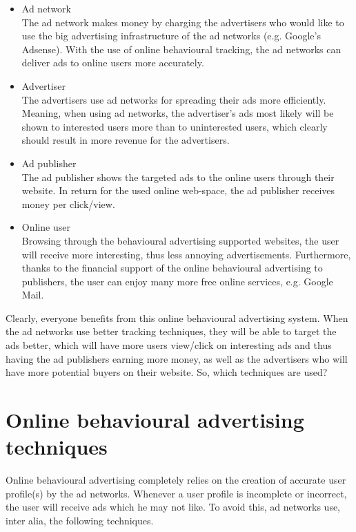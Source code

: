 \documentclass[11pt]{article}
\newcommand{\OBA}{Online behavioural advertising }
\newcommand{\oba}{online behavioural advertising }
\begin{document}
\begin{itemize}
	\item Ad network\\
			The ad network makes money by charging the advertisers who would like to use the big advertising infrastructure of the ad networks (e.g. Google's Adsense). With the use of online behavioural tracking, the ad networks can deliver ads to online users more accurately.

	\item Advertiser\\
			The advertisers use ad networks for spreading their ads more efficiently. Meaning, when using ad networks, the advertiser's ads most likely will be shown to interested users more than to uninterested users, which clearly should result in more revenue for the advertisers.

	\item Ad publisher\\
			The ad publisher shows the targeted ads to the online users through their website. In return for the used online web-space, the ad publisher receives money per click/view.

	\item Online user\\
			Browsing through the behavioural advertising supported websites, the user will receive more interesting, thus less annoying advertisements. Furthermore, thanks to the financial support of the \oba to publishers, the user can enjoy many more free online services, e.g. Google Mail. 
\end{itemize}

Clearly, everyone benefits from this \oba system.
When the ad networks use better tracking techniques, they will be able to target the ads better, which will have more users view/click on interesting ads and thus having the ad publishers earning more money, as well as the advertisers who will have more potential buyers on their website.
So, which techniques are used?

\section{\OBA techniques}
\label{techniques}
Online behavioural advertising completely relies on the creation of accurate user profile(s) by the ad networks. Whenever a user profile is incomplete or incorrect, the user will receive ads which he may not like. To avoid this, ad networks use, inter alia, the following techniques.
\end{document}
